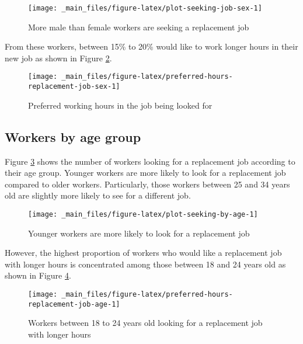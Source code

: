 \documentclass[
]{book}
\begin{document}
\begin{figure}

{\centering \texttt{[image: \_main\_files/figure-latex/plot-seeking-job-sex-1]} 

}

\caption{More male than female workers are seeking a replacement job}\label{fig:plot-seeking-job-sex}
\end{figure}

From these workers, between 15\% to 20\% would like to work longer hours in their new job as shown in
Figure \ref{fig:preferred-hours-replacement-job-sex}.

\begin{figure}

{\centering \texttt{[image: \_main\_files/figure-latex/preferred-hours-replacement-job-sex-1]} 

}

\caption{Preferred working hours in the job being looked for}\label{fig:preferred-hours-replacement-job-sex}
\end{figure}

\hypertarget{workers-by-age-group-2}{%
\subsection{Workers by age group}\label{workers-by-age-group-2}}

Figure \ref{fig:plot-seeking-by-age} shows the number of workers looking for a replacement job according to their age group. Younger workers are more likely to look for a replacement job compared to older workers. Particularly, those workers between 25 and 34 years old are slightly more likely to see for a different job.

\begin{figure}

{\centering \texttt{[image: \_main\_files/figure-latex/plot-seeking-by-age-1]} 

}

\caption{Younger workers are more likely to look for a replacement job}\label{fig:plot-seeking-by-age}
\end{figure}

However, the highest proportion of workers who would like a replacement job with longer hours is concentrated among those between 18 and 24 years old as shown in Figure \ref{fig:preferred-hours-replacement-job-age}.

\begin{figure}

{\centering \texttt{[image: \_main\_files/figure-latex/preferred-hours-replacement-job-age-1]} 

}

\caption{Workers between 18 to 24 years old looking for a replacement job with longer hours}\label{fig:preferred-hours-replacement-job-age}
\end{figure}
\end{document}
